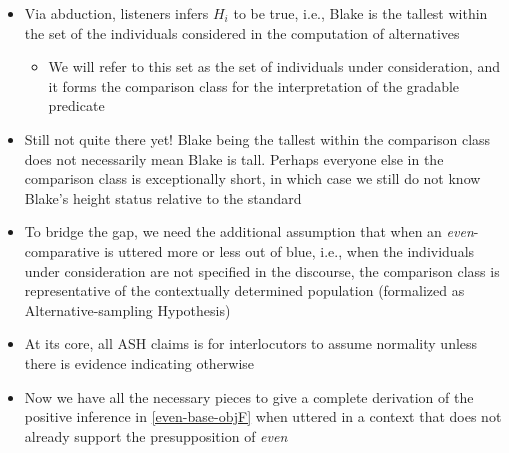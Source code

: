 \documentclass[11pt,letterpaper]{scrartcl}
\begin{document}
\begin{itemize}
\begin{itemize}
\begin{itemize}
            \end{itemize}
        
    \end{itemize}
    
    \item Via abduction, listeners infers $H_i$ to be true, i.e., Blake is the tallest within the set of the individuals considered in the computation of alternatives
    
    \begin{itemize}
        \item We will refer to this set as the set of individuals under consideration, and it forms the comparison class for the interpretation of the gradable predicate
    \end{itemize}
    
    \item Still not quite there yet! Blake being the tallest within the comparison class does not necessarily mean Blake is tall. Perhaps everyone else in the comparison class is exceptionally short, in which case we still do not know Blake's height status relative to the standard
    
    \item To bridge the gap, we need the additional assumption that when an \textit{even}-comparative is uttered more or less out of blue, i.e., when the individuals under consideration are not specified in the discourse, the comparison class is representative of the contextually determined population (formalized as Alternative-sampling Hypothesis)
    
    \item At its core, all ASH claims is for interlocutors to assume normality unless there is evidence indicating otherwise
    
    \item Now we have all the necessary pieces to give a complete derivation of the positive inference in \ref{even-base-objF} when uttered in a context that does not already support the presupposition of \textit{even}
    

\end{itemize}
\end{document}
